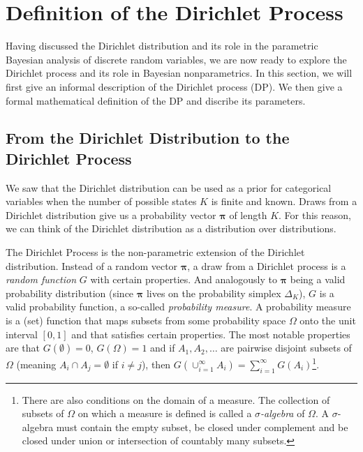 \documentclass[final,3p,times,twocolumn]{elsarticle}
\let\bs\boldsymbol
\begin{document}
\section{Definition of the Dirichlet Process}
\label{sect:dp}
Having discussed the Dirichlet distribution and its role in the parametric Bayesian analysis of discrete random variables, we are now ready to explore the Dirichlet process and its role in Bayesian nonparametrics.
In this section, we will first give an informal description of the Dirichlet process (DP).
We then give a formal mathematical definition of the DP and discribe its parameters.

\subsection{From the Dirichlet Distribution to the Dirichlet Process}
We saw that the Dirichlet distribution can be used as a prior for categorical variables when the number of possible states $K$ is finite and known. Draws from a Dirichlet distribution give us a probability vector $\bs \pi$ of length $K$. For this reason, we can think of the Dirichlet distribution as a distribution over distributions.

The Dirichlet Process is the non-parametric extension of the Dirichlet distribution.
Instead of a random vector $\bs \pi$, a draw from a Dirichlet process is a \emph{random function} $G$ with certain properties.
And analogously to $\bs \pi$ being a valid probability distribution (since $\bs \pi$ lives on the probability simplex $\Delta_K$), $G$ is a valid probability function, a so-called \emph{probability measure}.
A probability measure is a (set) function that maps subsets from some probability space $\Omega$ onto the unit interval $[0,1]$ and that satisfies certain properties.
The most notable properties are that $G(\emptyset)=0$, $G(\Omega)=1$ and if $A_1,A_2,\dots$ are pairwise disjoint subsets of $\Omega$ (meaning $A_i\cap A_j = \emptyset$ if $i\neq j$), then $G(\cup_{i=1}^\infty A_i) = \sum_{i=1}^\infty G(A_i)$\footnote{There are also conditions on the domain of a measure.
The collection of subsets of $\Omega$ on which a measure is defined is called a \emph{$\sigma$-algebra} of $\Omega$.
A $\sigma$-algebra must contain the empty subset, be closed under complement and be closed under union or intersection of countably many subsets.}.
\end{document}
